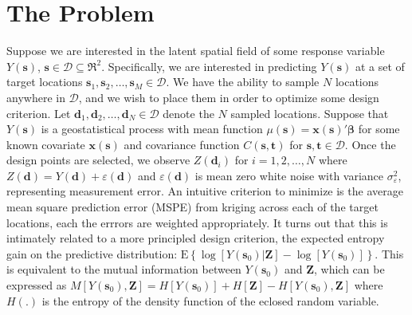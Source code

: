 \documentclass[12pt]{article}
\begin{document}
\section{The Problem}
Suppose we are interested in the latent spatial field of some response variable $Y(\bm{s})$, $\bm{s}\in \mathcal{D}\subseteq \Re^2$. Specifically, we are interested in predicting $Y(\bm{s})$ at a set of target locations $\bm{s}_1, \bm{s}_2, \dots, \bm{s}_M\in\mathcal{D}$. We have the ability to sample $N$ locations anywhere in $\mathcal{D}$, and we wish to place them in order to optimize some design criterion. Let $\bm{d}_1, \bm{d}_2, \dots, \bm{d}_N\in\mathcal{D}$ denote the $N$ sampled locations. Suppose that $Y(\bm{s})$ is a geostatistical process with mean function $\mu(\bm{s})=\bm{x}(\bm{s})'\bm{\beta}$ for some known covariate $\bm{x}(\bm{s})$ and covariance function $C(\bm{s}, \bm{t})$ for $\bm{s},\bm{t}\in\mathcal{D}$. Once the design points are selected, we observe $Z(\bm{d}_i)$ for $i=1,2,\dots,N$ where $Z(\bm{d}) = Y(\bm{d}) + \varepsilon(\bm{d})$ and $\varepsilon(\bm{d})$ is mean zero white noise with variance $\sigma^2_{\varepsilon}$, representing measurement error. An intuitive criterion to minimize is the average mean square prediction error (MSPE) from kriging across each of the target locations, each the errrors are weighted appropriately. It turns out that this is intimately related to a more principled design criterion, the expected entropy gain on the predictive distribution: $\mathrm{E}\left\{\log[Y(\bm{s}_0)|\bm{Z}] - \log[Y(\bm{s}_0)]\right\}$. This is equivalent to the mutual information between $Y(\bm{s}_0)$ and $\bm{Z}$, which can be expressed as $M[Y(\bm{s}_0),\bm{Z}] = H[Y(\bm{s}_0)] + H[\bm{Z}] - H[Y(\bm{s}_0), \bm{Z}]$ where $H(.)$ is the entropy of the density function of the eclosed random variable.
\end{document}
